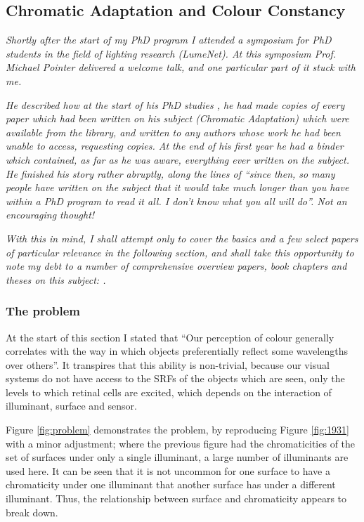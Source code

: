 \subsection{Chromatic Adaptation and Colour Constancy}

\textit{Shortly after the start of my PhD program I attended a symposium for PhD students in the field of lighting research (LumeNet). At this symposium Prof. Michael Pointer delivered a welcome talk, and one particular part of it stuck with me.}

\textit{He described how at the start of his PhD studies \citep{pointer_colour_1972}, he had made copies of every paper which had been written on his subject (Chromatic Adaptation) which were available from the library, and written to any authors whose work he had been unable to access, requesting copies. At the end of his first year he had a binder which contained, as far as he was aware, everything ever written on the subject. He finished his story rather abruptly, along the lines of ``since then, so many people have written on the subject that it would take much longer than you have within a PhD program to read it all. I don't know what you all will do''. Not an encouraging thought!}

\textit{With this in mind, I shall attempt only to cover the basics and a few select papers of particular relevance in the following section, and shall take this opportunity to note my debt to a number of comprehensive overview papers, book chapters and theses on this subject: \citet{foster_color_2011,maloney_computational_1984,barnard_practical_1999,smithson_sensory_2005,hurlbert_computational_1998,brainard_color_2014,fairchild_color_2013}.}

\subsubsection{The problem}

At the start of this section I stated that ``Our perception of colour generally correlates with the way in which objects preferentially reflect some wavelengths over others''. It transpires that this ability is non-trivial, because our visual systems do not have access to the \glspl{SRF} of the objects which are seen, only the levels to which retinal cells are excited, which depends on the interaction of illuminant, surface and sensor. 

Figure \ref{fig:problem} demonstrates the problem, by reproducing Figure \ref{fig:1931} with a minor adjustment; where the previous figure had the chromaticities of the set of surfaces under only a single illuminant, a large number of illuminants are used here. It can be seen that it is not uncommon for one surface to have a chromaticity under one illuminant that another surface has under a different illuminant. Thus, the relationship between surface and chromaticity appears to break down.

